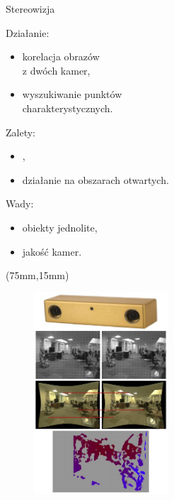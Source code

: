 \documentclass[xcolor=x11names,compress]{beamer}
\renewcommand{\(}{\begin{columns}}
\renewcommand{\)}{\end{columns}}
\newcommand{\<}[1]{\begin{column}{#1}}
\renewcommand{\>}{\end{column}}
\begin{document}
\begin{frame}{Stereowizja}

\alert{Działanie:}
\begin{itemize}
\item korelacja obrazów \\z dwóch kamer,
\item wyszukiwanie punktów \\charakterystycznych.
\end{itemize}

\vspace{.2cm}

\alert{Zalety:}
\begin{itemize}
\item ,
\item działanie na obszarach otwartych.
\end{itemize}

\vspace{.2cm}

\alert{Wady:}
\begin{itemize}
\item obiekty jednolite,
\item jakość kamer.
\end{itemize}

\begin{textblock*}{50mm}(75mm,15mm)%
    \begin{minipage}[l]{50mm}%

	\begin{figure}[h!]
    \centering
    \includegraphics[width=5.0cm]{../Common/img/stereo_steps_vert}
    \end{figure}

    \end{minipage}
\end{textblock*}

\end{frame}
\end{document}
